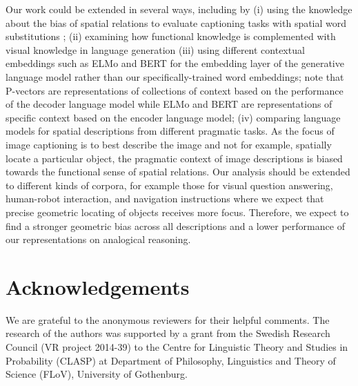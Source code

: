 Our work could be extended in several ways, including by %
(i) using the knowledge about the bias of spatial relations to evaluate captioning
tasks with spatial word substitutions
\cite{shekhar2017vision,shekhar2017foil};
(ii) examining how functional knowledge is complemented with visual knowledge
in language generation \cite{christie2016resolving,delecraz2017correcting}
(iii) using different contextual embeddings such as ELMo \cite{peters2018deep}
and BERT \cite{devlin2018bert}
for the embedding layer of the generative language model rather than our specifically-trained word embeddings; note that P-vectors are representations of collections of context based on the performance of the decoder language model while ELMo and BERT are representations of specific context based on the encoder language model;
(iv) comparing language models for spatial descriptions from different
pragmatic tasks. As the focus of image captioning is to best describe the image
and not for example, spatially locate a particular object, the pragmatic
context of image descriptions is biased towards the functional sense of spatial
relations. Our analysis should be extended
to different kinds of corpora, for example those for visual question answering,
human-robot interaction, and navigation instructions where we expect that precise
geometric locating of objects receives more focus. Therefore, we expect to find a
stronger geometric bias across all descriptions and a lower performance of our representations on analogical
reasoning.

\section*{Acknowledgements}
We are grateful to the anonymous reviewers for their helpful
comments. The research of the authors was supported by a grant from
the Swedish Research Council (VR project 2014-39) to the Centre for
Linguistic Theory and Studies in Probability (CLASP) at Department of
Philosophy, Linguistics and Theory of Science (FLoV), University of
Gothenburg.

